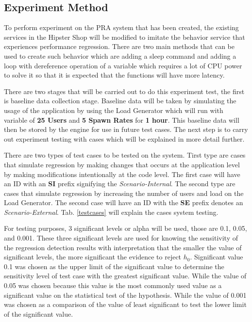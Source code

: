 \documentclass[conference]{configs/IEEEtran}
\begin{document}
\subsection{Experiment Method}
To perform experiment on the PRA system that has been created, the existing services in the Hipster Shop will be modified to imitate the behavior service that experiences performance regression. There are two main methods that can be used to create such behavior which are adding a sleep command and adding a loop with dereference operation of a variable which requires a lot of CPU power to solve it so that it is expected that the functions will have more latency.

There are two stages that will be carried out to do this experiment test, the first is baseline data collection stage. Baseline data will be taken by simulating
the usage of the application by using the Load Generator which will run with variable of \textbf{25 Users} and \textbf{5 Spawn Rates} for \textbf{1 hour}. This baseline data will then be stored by the engine for use in future test cases. The next step is to carry out experiment testing with cases which will be explained in more detail further.

There are two types of test cases to be tested on the system. Tirst type are cases that simulate regression by making changes that occurs at the application level by making modifications intentionally at the code level.
The first case will have an ID with an \textbf{SI} prefix signifying the \textit{Scenario-Internal}.
The second type are cases that simulate regression by increasing the number of users and load on the Load Generator. The second case will have an ID with the \textbf{SE} prefix denotes an \textit{Scenario-External}. Tab. \ref{testcases} will explain the cases
system testing.

For testing purposes, 3 significant levels or alpha will be used, those are 0.1, 0.05, and 0.001. These three significant levels are used for knowing the sensitivity of the regression detection results with interpretation that the smaller the value of
significant levels, the more significant the evidence to reject $h_{0}$. Significant value 0.1
was chosen as the upper limit of the significant value to determine the sensitivity level of test case with the greatest significant value. While the value of 0.05 was chosen because this value is the most commonly used value as a significant value on the statistical test of the hypothesis. While the value of 0.001 was chosen as a comparison of the value of least significant to test the lower limit of the significant value.
\end{document}
